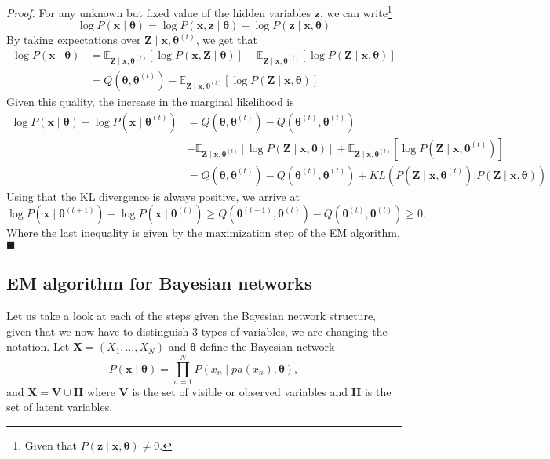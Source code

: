 \documentclass[11pt]{article}
\theoremstyle{definition}
\begin{document}
\emph{Proof. } For any unknown but fixed value of the hidden variables \( \bm{z} \), we can write\footnote{Given that \( P(\bm{z} \mid \bm{x}, \bm{\theta}) \neq 0\).  }
\[
     \log P(\bm{x} \mid \bm{\theta}) = \log P(\bm{x}, \bm{z} \mid \bm{\theta}) - \log P(\bm{z} \mid \bm{x}, \bm{\theta})
\]
By taking expectations over \( \bm{Z} \mid \bm{x}, \bm{\theta}^{(t)} \), we get that
\[
    \begin{aligned}
\log P(\bm{x} \mid \bm{\theta}) &= \mathbb{E}_{\bm{Z} \mid \bm{x}, \bm{\theta}^{(t)}} \left[ \log P(\bm{x}, \bm{Z} \mid \bm{\theta}) \right] - \mathbb{E}_{\bm{Z} \mid \bm{x}, \bm{\theta}^{(t)}} \left[ \log P(\bm{Z} \mid \bm{x}, \bm{\theta}) \right]\\
        &= Q(\bm{\theta}, \bm{\theta}^{(t)}) - \mathbb{E}_{\bm{Z} \mid \bm{x}, \bm{\theta}^{(t)}} \left[ \log P(\bm{Z} \mid \bm{x}, \bm{\theta}) \right]
    \end{aligned}
\]
Given this quality, the increase in the marginal likelihood is
\[
    \begin{aligned}
     \log P(\bm{x} \mid \bm{\theta}) - \log P(\bm{x} \mid \bm{\theta}^{(t)}) &= 
 Q(\bm{\theta}, \bm{\theta}^{(t)}) -  Q(\bm{\theta}^{(t)}, \bm{\theta}^{(t)})\\
 & - \mathbb{E}_{\bm{Z} \mid \bm{x}, \bm{\theta}^{(t)}} \left[ \log P(\bm{Z} \mid \bm{x}, \bm{\theta})\right] + \mathbb{E}_{\bm{Z} \mid \bm{x}, \bm{\theta}^{(t)}} \left[ \log P(\bm{Z} \mid \bm{x}, \bm{\theta}^{(t)}) \right]\\
&=  Q(\bm{\theta}, \bm{\theta}^{(t)}) -  Q(\bm{\theta}^{(t)}, \bm{\theta}^{(t)}) + KL\left(  P(\bm{Z} \mid \bm{x}, \bm{\theta}^{(t)}) \bigl\vert  P(\bm{Z} \mid \bm{x}, \bm{\theta})\right)
    \end{aligned}
\]
Using that the KL divergence is always positive, we arrive at
\[
      \log P(\bm{x} \mid \bm{\theta}^{(t+1)}) - \log P(\bm{x} \mid \bm{\theta}^{(t)}) \geq  Q(\bm{\theta}^{(t+1)}, \bm{\theta}^{(t)}) -  Q(\bm{\theta}^{(t)}, \bm{\theta}^{(t)}) \geq 0.
\]
Where the last inequality is given by the maximization step of the EM algorithm.
\hfill \( \blacksquare \) 

\subsection{EM algorithm for Bayesian networks}

Let us take a look at each of the steps given the Bayesian network structure, given that we now have to distinguish 3 types of variables, we are changing the notation. Let \( \bm{X} = (X_1, \dots, X_N ) \) and \( \bm{\theta} \) define the Bayesian network 
\[
     P(\bm{x} \mid \bm{\theta}) = \prod_{n=1}^N P(x_n \mid pa(x_n), \bm{\theta}),
\]  
and \( \bm{X} = \bm{V} \cup \bm{H} \) where \( \bm{V} \) is the set of visible or observed variables and \( \bm{H} \) is the set of latent variables. 
\end{document}
